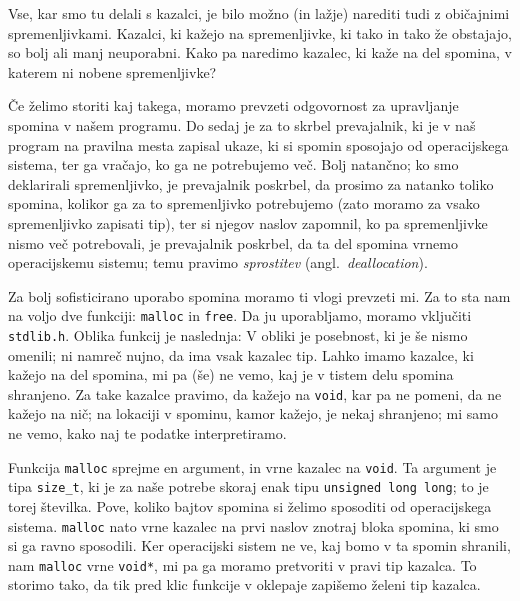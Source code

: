 \documentclass{book}
\begin{document}
\newpage
\begin{examples}
\end{examples}

Vse, kar smo tu delali s kazalci, je bilo možno (in lažje) narediti tudi z
običajnimi spremenljivkami. Kazalci, ki kažejo na spremenljivke, ki tako in tako
že obstajajo, so bolj ali manj neuporabni. Kako pa naredimo kazalec, ki kaže
na del spomina, v katerem ni nobene spremenljivke?

Če želimo storiti kaj takega, moramo prevzeti odgovornost za upravljanje spomina
v našem programu. Do sedaj je za to skrbel prevajalnik, ki je v naš program na
pravilna mesta zapisal ukaze, ki si spomin sposojajo od operacijskega sistema,
ter ga vračajo, ko ga ne potrebujemo več. Bolj natančno; ko smo deklarirali
spremenljivko, je prevajalnik poskrbel, da prosimo za natanko toliko spomina,
kolikor ga za to spremenljivko potrebujemo (zato moramo za vsako spremenljivko
zapisati tip), ter si njegov naslov zapomnil,
ko pa spremenljivke nismo več potrebovali, je prevajalnik poskrbel, da ta del
spomina vrnemo operacijskemu sistemu; temu pravimo \emph{sprostitev}
(angl.~\textit{deallocation}).

Za bolj sofisticirano uporabo spomina moramo ti vlogi prevzeti mi. Za to sta
nam na voljo dve funkciji: \verb+malloc+ in \verb+free+. Da ju uporabljamo,
moramo vključiti \verb+stdlib.h+.
Oblika funkcij je naslednja:
V obliki je posebnost, ki je še nismo omenili; ni namreč nujno, da ima vsak
kazalec tip. Lahko imamo kazalce, ki kažejo na del spomina, mi pa (še) ne vemo,
kaj je v tistem delu spomina shranjeno. Za take kazalce pravimo, da kažejo
na \verb+void+, kar pa ne pomeni, da ne kažejo na nič; na lokaciji v spominu,
kamor kažejo, je nekaj shranjeno; mi samo ne vemo, kako naj te podatke
interpretiramo.

Funkcija \verb+malloc+ sprejme en argument, in vrne kazalec na \verb+void+.
Ta argument je tipa \verb+size_t+, ki je za naše potrebe skoraj enak tipu
\verb+unsigned long long+; to je torej številka. Pove, koliko bajtov spomina si
želimo sposoditi od operacijskega sistema. \verb+malloc+ nato vrne kazalec na
prvi naslov znotraj bloka spomina, ki smo si ga ravno sposodili. Ker operacijski
sistem ne ve, kaj bomo v ta spomin shranili, nam \verb+malloc+ vrne \verb+void*+,
mi pa ga moramo pretvoriti v pravi tip kazalca. To storimo tako, da tik pred
klic funkcije v oklepaje zapišemo želeni tip kazalca.
\end{document}

